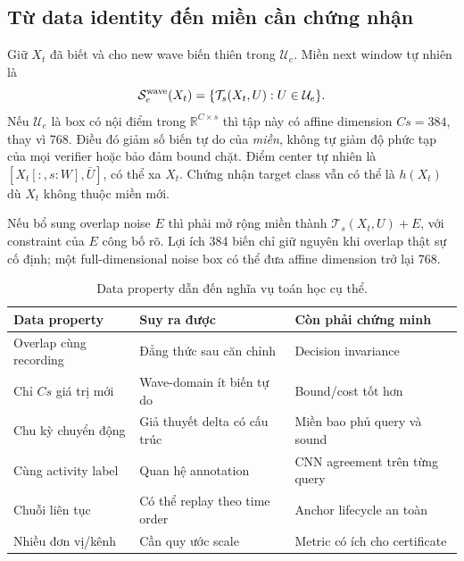 \documentclass[11pt,a4paper]{article}
\newcommand{\R}{\mathbb R}
\newcommand{\Sset}{\mathcal S}
\newcommand{\Uset}{\mathcal U}
\theoremstyle{remark}
\begin{document}
\subsection{Từ data identity đến miền cần chứng nhận}
Giữ $X_t$ đã biết và cho new wave biến thiên trong $\Uset_e$. Miền next
window tự nhiên là
\begin{equation}
 \Sset^{\rm wave}_e(X_t)=
 \{\mathcal T_s(X_t,U):U\in\Uset_e\}.
 \label{eq:wave-domain}
\end{equation}
Nếu $\Uset_e$ là box có nội điểm trong $\R^{C\times s}$ thì tập này có
affine dimension $Cs=384$, thay vì 768. Điều đó giảm số biến tự do của
\emph{miền}, không tự giảm độ phức tạp của mọi verifier hoặc bảo đảm bound
chặt. Điểm center tự nhiên là $[X_t[:,s:W],\bar U]$, có thể xa $X_t$.
Chứng nhận target class vẫn có thể là $h(X_t)$ dù $X_t$ không thuộc miền mới.

Nếu bổ sung overlap noise $E$ thì phải mở rộng miền thành
$\mathcal T_s(X_t,U)+E$, với constraint của $E$ công bố rõ. Lợi ích 384
biến chỉ giữ nguyên khi overlap thật sự cố định; một full-dimensional
noise box có thể đưa affine dimension trở lại 768.

\begin{table}[!htbp]\centering
\caption{Data property dẫn đến nghĩa vụ toán học cụ thể.}
\begin{tabularx}{\linewidth}{@{}YYY@{}}\toprule
Data property & Suy ra được & Còn phải chứng minh\\\midrule
Overlap cùng recording & Đẳng thức sau căn chỉnh & Decision invariance\\
Chỉ $Cs$ giá trị mới & Wave-domain ít biến tự do & Bound/cost tốt hơn\\
Chu kỳ chuyển động & Giả thuyết delta có cấu trúc & Miền bao phủ query và sound\\
Cùng activity label & Quan hệ annotation & CNN agreement trên từng query\\
Chuỗi liên tục & Có thể replay theo time order & Anchor lifecycle an toàn\\
Nhiều đơn vị/kênh & Cần quy ước scale & Metric có ích cho certificate\\\bottomrule
\end{tabularx}
\end{table}
\end{document}
